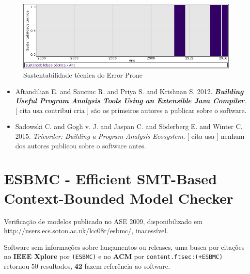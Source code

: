 \begin{figure}[h]
  \center
  \includegraphics[scale=0.50]{result-documents/charts/error-prone.png}
  \caption{Sustentabilidade técnica do Error Prone}
\end{figure}


\begin{itemize}
\item Aftandilian E. and Sauciuc R. and Priya S. and Krishnan S.
      2012.
        \textbf{\textit{ Building Useful Program Analysis Tools Using an Extensible Java Compiler}}.
      [
          cita
          usa
          contribui
          cria
      ]
são os primeiros autores a publicar sobre o software.
\item Sadowski C. and Gogh v. J. and Jaspan C. and Söderberg E. and Winter C.
      2015.
        \textit{ Tricorder: Building a Program Analysis Ecosystem}.
      [
          cita
          usa
      ]
nenhum dos autores publicou sobre o software antes.
\end{itemize}
\section{ESBMC - Efficient SMT-Based Context-Bounded Model Checker}

Verificação de modelos
publicado no ASE 2009,
disponibilizado em \url{http://users.ecs.soton.ac.uk/lcc08r/esbmc/},
inacessível.

Software sem informações sobre lançamentos ou releases,
uma busca por citações no {\bf IEEE Xplore} por
\texttt{(ESBMC)}
e no {\bf ACM} por
\texttt{content.ftsec:(+ESBMC)}
retornou
50 resultados,
{\bf 42} fazem referência ao software.


